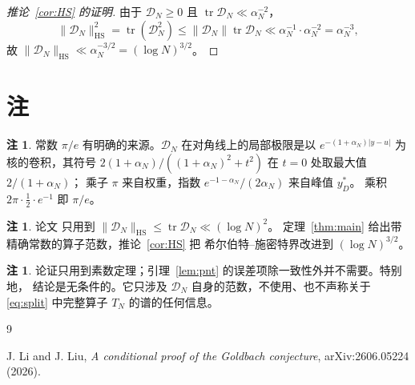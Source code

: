 \documentclass[12pt,a4paper]{amsart}
\numberwithin{equation}{section}
\theoremstyle{plain}
\theoremstyle{definition}
\newtheorem{remark}[theorem]{注}
\newcommand{\HS}{\mathrm{HS}}
\begin{document}
\begin{proof}[推论~\ref{cor:HS} 的证明]
由于 $\mathcal D_N\ge0$ 且 $\operatorname{tr}\mathcal D_N\ll\alpha_N^{-2}$，
\[
 \|\mathcal D_N\|_{\HS}^2=\operatorname{tr}(\mathcal D_N^2)
 \le\|\mathcal D_N\|\operatorname{tr}\mathcal D_N
 \ll\alpha_N^{-1}\cdot\alpha_N^{-2}=\alpha_N^{-3},
\]
故 $\|\mathcal D_N\|_{\HS}\ll\alpha_N^{-3/2}=(\log N)^{3/2}$。
\end{proof}

\section{注}\label{sec:remarks}

\begin{remark}\label{rem:constant}
常数 $\pi/e$ 有明确的来源。$\mathscr D_N$ 在对角线上的局部极限是以
$e^{-(1+\alpha_N)|y-u|}$ 为核的卷积，其符号
$2(1+\alpha_N)/((1+\alpha_N)^2+t^2)$ 在 $t=0$ 处取最大值 $2/(1+\alpha_N)$；
乘子 $\pi$ 来自权重，指数 $e^{-1-\alpha_N}/(2\alpha_N)$ 来自峰值 $y_D^*$。
乘积 $2\pi\cdot\frac12\cdot e^{-1}$ 即 $\pi/e$。
\end{remark}

\begin{remark}\label{rem:vsLL}
论文 \cite[命题 6.5]{LL} 只用到
$\|\mathcal D_N\|_{\HS}\le\operatorname{tr}\mathcal D_N\ll(\log N)^2$。
定理~\ref{thm:main} 给出带精确常数的算子范数，推论~\ref{cor:HS} 把
希尔伯特--施密特界改进到 $(\log N)^{3/2}$。
\end{remark}

\begin{remark}\label{rem:limitation}
论证只用到素数定理；引理~\ref{lem:pnt} 的误差项除一致性外并不需要。特别地，
结论是无条件的。它只涉及 $\mathcal D_N$ 自身的范数，不使用、也不声称关于
\eqref{eq:split} 中完整算子 $T_N$ 的谱的任何信息。
\end{remark}

\begin{thebibliography}{9}

J. Li and J. Liu,
\emph{A conditional proof of the Goldbach conjecture},
arXiv:2606.05224 (2026).

\end{thebibliography}
\end{document}
